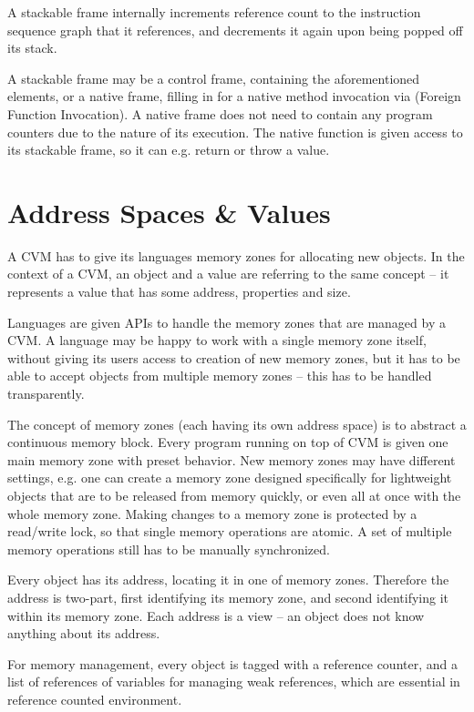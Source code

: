 A stackable frame internally increments reference count to the instruction sequence graph that it references, and decrements it again upon being popped off its stack. 

A stackable frame may be a control frame, containing the aforementioned elements, or a native frame, filling in for a native method invocation via  (Foreign Function Invocation). A native frame does not need to contain any program counters due to the nature of its execution. The native function is given access to its stackable frame, so it can e.g. return or throw a value. 






\section{Address Spaces \& Values}

A CVM has to give its languages memory zones for allocating new objects. In the context of a CVM, an object and a value are referring to the same concept -- it represents a value that has some address, properties and size. 

Languages are given APIs to handle the memory zones that are managed by a CVM. A language may be happy to work with a single memory zone itself, without giving its users access to creation of new memory zones, but it has to be able to accept objects from multiple memory zones -- this has to be handled transparently. 

The concept of memory zones (each having its own address space) is to abstract a continuous memory block. Every program running on top of CVM is given one main memory zone with preset behavior. New memory zones may have different settings, e.g. one can create a memory zone designed specifically for lightweight objects that are to be released from memory quickly, or even all at once with the whole memory zone. Making changes to a memory zone is protected by a read/write lock, so that single memory operations are atomic. A set of multiple memory operations still has to be manually synchronized. 

Every object has its address, locating it in one of memory zones. Therefore the address is two-part, first identifying its memory zone, and second identifying it within its memory zone. Each address is a view -- an object does not know anything about its address. 

For memory management, every object is tagged with a reference counter, and a list of references of variables for managing weak references, which are essential in reference counted environment. 

